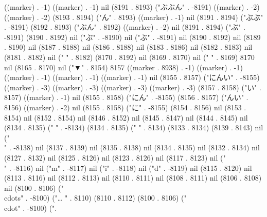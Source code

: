 ((marker) . -1) ((marker) . -1) nil (8191 . 8193) ("ぶぶん" . -8191) ((marker) . -2) ((marker) . -2) (8193 . 8194) ("ん" . 8193) ((marker) . -1) nil (8191 . 8194) ("ぶぶ" . -8191) (8192 . 8193) ("ぶん" . 8192) ((marker) . -2) nil (8191 . 8194) ("ぶ" . -8191) (8190 . 8192) nil ("ぶ" . -8190) nil ("ぶ" . -8191) nil (8190 . 8192) nil (8189 . 8190) nil (8187 . 8188) nil (8186 . 8188) nil (8183 . 8186) nil (8182 . 8183) nil (8181 . 8182) nil (" " . 8182) (8170 . 8192) nil (8169 . 8170) nil (" " . 8169) 8170 nil (8165 . 8170) nil ("▼" . 8154) 8157 ((marker . 8938) . -1) ((marker) . -1) ((marker) . -1) ((marker) . -1) ((marker) . -1) nil (8155 . 8157) ("にんい" . -8155) ((marker) . -3) ((marker) . -3) ((marker) . -3) ((marker) . -3) (8157 . 8158) ("い" . 8157) ((marker) . -1) nil (8155 . 8158) ("にん" . -8155) (8156 . 8157) ("んい" . 8156) ((marker) . -2) nil (8155 . 8158) ("に" . -8155) (8154 . 8156) nil (8153 . 8154) nil (8152 . 8154) nil (8146 . 8152) nil (8145 . 8147) nil (8144 . 8145) nil (8134 . 8135) (" " . -8134) (8134 . 8135) (" " . 8134) (8133 . 8134) (8139 . 8143) nil ("\\" . -8138) nil (8137 . 8139) nil (8135 . 8138) nil (8134 . 8135) nil (8132 . 8134) nil (8127 . 8132) nil (8125 . 8126) nil (8123 . 8126) nil (8117 . 8123) nil ("\\" . -8116) nil ("m" . -8117) nil ("i" . -8118) nil ("d" . -8119) nil (8115 . 8120) nil (8113 . 8116) nil (8112 . 8113) nil (8110 . 8111) nil (8108 . 8111) nil (8106 . 8108) nil (8100 . 8106) ("\\cdots" . -8100) ("…
" . 8110) (8110 . 8112) (8100 . 8106) ("\\cdot" . -8100) (".
